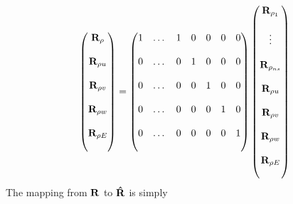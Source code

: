 \documentclass{article}   	%
\begin{document}
\begin{equation}
  \begin{pmatrix}
    \mathbf R_{\rho}      \\ \\
    \mathbf R_{\rho u}    \\ \\
		\mathbf R_{\rho v}    \\ \\
		\mathbf R_{\rho w}    \\ \\
		\mathbf R_{\rho E}    \\ \\
  \end{pmatrix} =
  \begin{pmatrix}
    1  &  \dots  &  1  &  0  &  0  &  0  &  0  \\ \\
    0  &  \dots  &  0  &  1  &  0  &  0  &  0  \\ \\
    0  &  \dots  &  0  &  0  &  1  &  0  &  0  \\ \\
    0  &  \dots  &  0  &  0  &  0  &  1  &  0  \\ \\
    0  &  \dots  &  0  &  0  &  0  &  0  &  1  \\ \\
  \end{pmatrix}
  \begin{pmatrix}
    \mathbf R_{\rho_1}    \\ \\
         \vdots     \\ \\
    \mathbf R_{\rho_{ns}} \\ \\
    \mathbf R_{\rho u}    \\ \\
		\mathbf R_{\rho v}    \\ \\
		\mathbf R_{\rho w}    \\ \\
		\mathbf R_{\rho E}    \\ \\
  \end{pmatrix}
  \label{R-map1}
\end{equation}
The mapping from $\mathbf R$ to $\mathbf{\hat{R}}$ is simply
\end{document}
